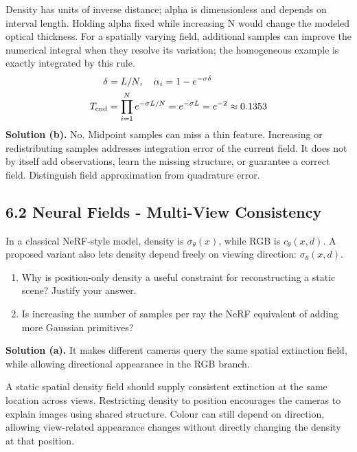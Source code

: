 \documentclass[11pt,a4paper]{article}
\begin{document}
Density has units of inverse distance; alpha is dimensionless and depends on interval length.
Holding alpha fixed while increasing N would change the modeled optical thickness.
For a spatially varying field, additional samples can improve the numerical integral when they resolve its variation; the homogeneous example is exactly integrated by this rule.
\[
\begin{aligned}\delta&=L/N,\quad\alpha_i=1-e^{-\sigma\delta}\\T_{\rm end}&=\prod_{i=1}^N e^{-\sigma L/N}=e^{-\sigma L}=e^{-2}\approx0.1353\end{aligned}
\]
\noindent\textbf{Solution (b).} No.
Midpoint samples can miss a thin feature.
Increasing or redistributing samples addresses integration error of the current field.
It does not by itself add observations, learn the missing structure, or guarantee a correct field.
Distinguish field approximation from quadrature error.
\subsection*{6.2 Neural Fields - Multi-View Consistency}
In a classical NeRF-style model, density is $\sigma_\theta(x)$, while RGB is $c_\theta(x,d)$.
A proposed variant also lets density depend freely on viewing direction: $\sigma_\theta(x,d)$.
\begin{enumerate}[label=(\alph*),nosep]
\item Why is position-only density a useful constraint for reconstructing a static scene?
Justify your answer.
\item Is increasing the number of samples per ray the NeRF equivalent of adding more Gaussian primitives?
\end{enumerate}
\noindent\textbf{Solution (a).} It makes different cameras query the same spatial extinction field, while allowing directional appearance in the RGB branch.

A static spatial density field should supply consistent extinction at the same location across views.
Restricting density to position encourages the cameras to explain images using shared structure.
Colour can still depend on direction, allowing view-related appearance changes without directly changing the density at that position.
\end{document}
